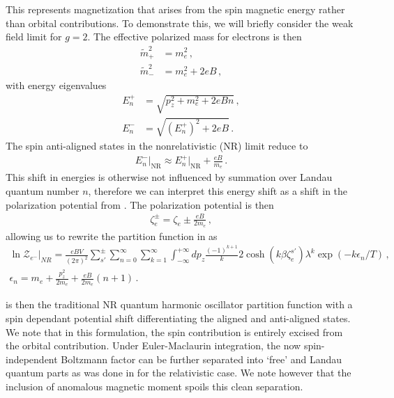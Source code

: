 This represents magnetization that arises from the spin magnetic energy rather than orbital contributions. To demonstrate this, we will briefly consider the weak field limit for $g=2$. The effective polarized mass for electrons is then
\begin{align}
 \label{MagMassPlus}
 \tilde{m}_{+}^{2}&=m_{e}^{2}\,,\\
 \label{MagMassMinus}
 \tilde{m}_{-}^{2}&=m_{e}^{2}+2eB\,,
\end{align}
with energy eigenvalues
\begin{align}
 \label{EPlus}
 E_{n}^{+}&=\sqrt{p_{z}^{2}+m_{e}^{2}+2eBn}\,,\\
 \label{EMinus}
 E_{n}^{-}&=\sqrt{\left(E_{n}^{+}\right)^{2}+2eB}\,.
\end{align}
The spin anti-aligned states in the nonrelativistic (NR) limit reduce to
\begin{align}
 \label{EMinusNR} E_{n}^{-}\vert_\mathrm{NR}\approx E_{n}^{+}\vert_\mathrm{NR}+\frac{eB}{m_{e}}\,.
\end{align}
This shift in energies is otherwise not influenced by summation over Landau quantum number $n$, therefore we can interpret this energy shift as a shift in the polarization potential from . The polarization potential is then
\begin{align}
 \label{SpinChem} \zeta_{e}^{\pm}=\zeta_{e}\pm\frac{eB}{2m_{e}}\,,
\end{align}
allowing us to rewrite the partition function in  as
\begin{gather}
 \label{PartTotalNR} \ln\mathcal{Z}_{e^{-}}\vert_{NR}=\frac{eBV}{(2\pi)^{2}}\sum_{s'}^{\pm}\sum_{n=0}^{\infty}\sum_{k=1}^{\infty}\int_{-\infty}^{+\infty}dp_{z}\frac{(-1)^{k+1}}{k}2\cosh(k\beta\zeta_{e}^{s'})\lambda^{k}\exp(-k\epsilon_{n}/T)\,,\\
 \label{NREnergy} \epsilon_{n}=m_{e}+\frac{p_{z}^{2}}{2m_{e}}+\frac{eB}{2m_{e}}\left(n+1\right)\,.
\end{gather}

 is then the traditional NR quantum harmonic oscillator partition function with a spin dependant potential shift differentiating the aligned and anti-aligned states. We note that in this formulation, the spin contribution is entirely excised from the orbital contribution. Under Euler-Maclaurin integration, the now spin-independent Boltzmann factor can be further separated into `free' and Landau quantum parts as was done in  for the relativistic case. We note however that the inclusion of anomalous magnetic moment spoils this clean separation.

